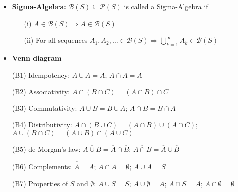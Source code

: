 \begin{itemize}
\item {\bf Sigma-Algebra:}  $\mathcal{B}(S) \subseteq \mathcal{P}(S)$ is called a Sigma-Algebra if  
\begin{itemize}
\item[(i)] $A \in \mathcal{B}(S)  \Rightarrow \overline{A} \in \mathcal{B}(S)  $
\item[(ii)] For all sequences $A_1, A_2, \dots \in \mathcal{B}(S)  \Rightarrow \bigcup_{k=1}^\infty A_k \in \mathcal{B}(S)  $ 
\end{itemize}

\item {\bf Venn diagram} 

\end{itemize}

\begin{proposition}
\begin{itemize}
\item[(B1)] Idempotency: $A \cup A = A$;   \hspace{.5cm} $A \cap A = A$
\item[(B2)] Associativity: $A \cap (B\cap C) = (A\cap B) \cap C$  
\item[(B3)] Commutativity: $A \cup B = B \cup A$;    \hspace{.5cm}  $A \cap B = B \cap A$
\item[(B4)] Distributivity: $A \cap (B\cup C)  = (A \cap B) \cup (A \cap C)$; \hspace{.5cm}  $A \cup (B\cap C)  = (A \cup B) \cap (A \cup C)$
\item[(B5)] de Morgan's law:  $\overline{A \cup B} = \overline{A} \cap \overline{B} $;    \hspace{.5cm}  $\overline{A \cap B} = \overline{A} \cup \overline{B} $
\item[(B6)] Complements: $ \overline{ \overline{A}} =  A$; \hspace{.5cm}  $A \cap \overline{A} = \emptyset$; \hspace{.5cm}  $A \cup \overline{A} = S$
\item[(B7)] Properties of $S$ and $ \emptyset$: \hspace{.2cm} $A \cup S = S$; \hspace{.5cm} $A \cup \emptyset = A$; \hspace{.5cm} $A \cap S = A$; \hspace{.5cm} $A \cap \emptyset = \emptyset$

\end{itemize}
\end{proposition}

